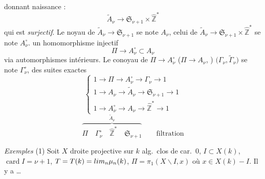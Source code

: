 \documentclass[11pt,a4paper]{article}
\begin{document}
donnant naissance :
\[
  \widetilde{A}_\nu \longrightarrow \mathfrak{S}_{\nu+1} \times \hat{\mathbb{Z}}^{*}
\]
qui est \emph{surjectif}. Le noyau de $\widetilde{A}_\nu \to \mathfrak{S}_{\nu+1}$
se note $A_\nu$, celui de
$\widetilde{A}_\nu \to \mathfrak{S}_{\nu+1} \times \hat{\mathbb{Z}}^{*}$
se note $A_\nu^{\circ}$.  un
homomorphisme injectif
\[
  \Pi \longrightarrow A_\nu^{\circ} \subset A_\nu
\]
via automorphismes intérieurs. Le conoyau de $\Pi \to A_\nu^{\circ}$
($\Pi \to A_\nu$, )
$\bigl(\Gamma_\nu, \widetilde{\Gamma}_\nu\bigr)$ se note $\Gamma_\nu^{\circ}$,
 \ill{} des suites exactes
\[
  \begin{cases}
    1 \to \Pi \to A_\nu^{\circ} \to \Gamma_\nu \to 1 \\
    1 \to A_\nu \to \widetilde{A}_\nu \to \mathfrak{S}_{\nu+1} \to 1 \\
    1 \to A_\nu^{\circ} \to A_\nu \to \hat{\mathbb{Z}}^{*} \to 1
  \end{cases}
\]
\[
  \overbrace{\Pi \quad \Gamma_\nu^{\circ} \quad \hat{\mathbb{Z}}^{*} \quad \mathfrak{S}_{\nu+1}}^{\widetilde{A}_\nu}
  \qquad \text{filtration}
\]

\emph{Exemples} (1) Soit $X$ droite projective sur
$k$ alg.\ clos de car.\ $0$, $I \subset X(k)$, $\operatorname{card} I = \nu + 1$,
$T = T(k) = \varprojlim_n \mu_n(k)$, $\Pi = \pi_1(X \smallsetminus I, x)$
où $x \in X(k) - I$. Il y a \ill{} \ldots
{}
\end{document}
